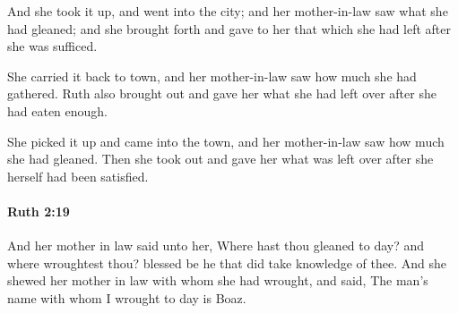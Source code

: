 			\begin{versebox}
					\item[BHS] 
					\item[LXX] 
					\item[ASV] And she took it up, and went into the city; and her mother-in-law saw what she had gleaned; and she brought forth and gave to her that which she had left after she was sufficed.
					\item[NIV] She carried it back to town, and her mother-in-law saw how much she had gathered. Ruth also brought out and gave her what she had left over after she had eaten enough.
					\item[NRSV] She picked it up and came into the town, and her mother-in-law saw how much she had gleaned. Then she took out and gave her what was left over after she herself had been satisfied.
			\end{versebox}

		\paragraph{Ruth 2:19} %
			\label{RUTH-2-19}

			And her mother in law said unto her, Where hast thou gleaned to day? and where wroughtest thou? blessed be he that did take knowledge of thee. And she shewed her mother in law with whom she had wrought, and said, The man’s name with whom I wrought to day is Boaz.

